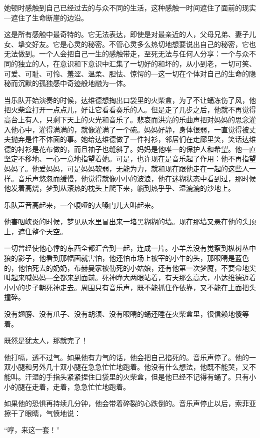 她顿时感触到自己已经过去的与众不同的生活，这种感触一时间遮住了面前的现实—遮住了生命断崖的边沿。

这是所有感触中最奇特的。它无法表达，即使是对最亲近的人，父母兄弟、妻子儿女、挚交好友。它是心灵的秘密。不管心灵多么热切地想要说出自己的秘密，它也无法做到。一个人会把自己一生的感触带走，至死无法与任何人分享：一个与众不同的独立的人，在意识和下意识中汇集了一切好的和坏的，从小到老，一切可笑、可爱、可耻、可怜、羞涩、温柔、胆怯、惊愕的—这一切在个体对自己的生命的隐秘而沉默的孤独感中奇迹般地融为一体。

当乐队开始演奏的时候，达维德想掏出口袋里的火柴盒，为了不让蛹冻伤了风，他把火柴盒打开一点点儿，好让它看看奏乐的人。但是走了几步之后，他就不再觉得高台上有人，只剩下天上的火光和音乐了。悲哀而洪亮的乐曲声把对妈妈的思念灌入他心中，灌得满满的，就像灌满了一个碗。妈妈好静，身体很弱，一直觉得被丈夫抛弃是件不体面的事。她给达维德做了一件衬衫，邻居们在走廊里笑，笑话达维德的衬衫是花布做的，而且袖子也缝斜了。妈妈是他唯一的保护人和希望。他一直坚定不移地、一心一意地指望着她。可是，也许现在是音乐起了作用：他不再指望妈妈了。他爱妈妈，可是妈妈软弱，无能为力，就和现在跟他走在一起的这些人一样。音乐声悠忽而缓慢，他觉得就像小小的波浪，他在迷糊状态中看到过，那时候他发着高烧，梦到从滚热的枕头上爬下来，躺到热乎乎、湿漉漉的沙地上。

乐队声音高起来，一个嗄哑的大嗓门儿大叫起来。

他害咽峡炎的时候，梦见从水里冒出来一堵黑糊糊的墙。现在那墙又悬在他的头顶上，遮住整个天空。

一切曾经使他心悸的东西全都汇合到一起，连成一片。小羊羔没有觉察到枞树丛中狼的影子，他看到那幅画就害怕，他还怕市场上被宰的小牛的头，那眼睛是蓝色的，他怕死去的奶奶，布赫曼家被勒死的小姑娘，还有他第一次梦魇，不要命地尖叫起来喊妈妈—全都来到面前。死神睁大两眼站着，有天那么高大，小达维德迈着小小的步子朝死神走去。周围只有音乐声，既不能抓住作依靠，又不能在上面把头撞碎。

没有翅膀、没有爪子、没有胡须、没有眼睛的蛹还睡在火柴盒里，很信赖地傻等着。

既然是犹太人，那就完了！

他打嗝，透不过气。如果他有力气的话，他会把自己掐死的。音乐声停了。他的一双小腿和另外几十双小腿在急急忙忙地跑着。他没有什么想法，他既不能哭，又不能叫。汗湿的手指头紧紧捏住口袋里的火柴盒，但是他已经不记得有蛹了。只有小小的腿在走着，走着，急急忙忙地跑着。

如果他的恐惧再持续几分钟，他会带着碎裂的心跌倒的。音乐声停止以后，索菲亚擦干了眼睛，气愤地说：

“哼，来这一套！”

